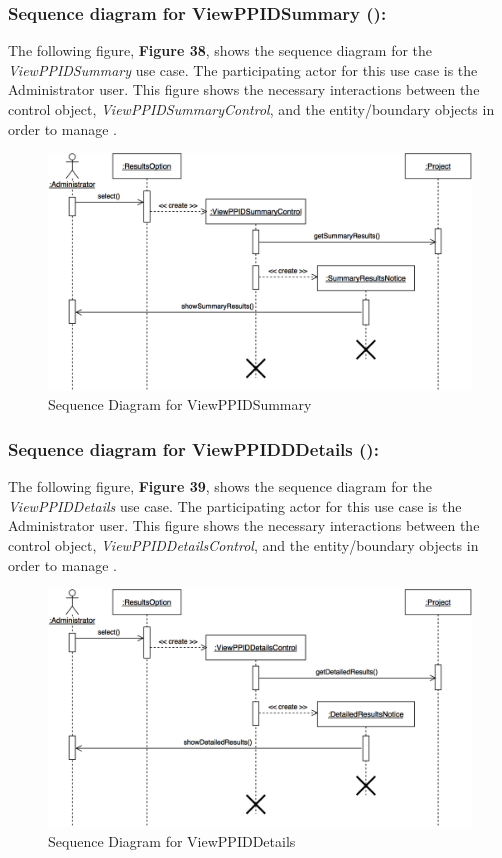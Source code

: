 \documentclass[12pt,letterpaper]{article}
\begin{document}
\subsubsection*{Sequence diagram for ViewPPIDSummary (\viewppidsummary{}):}

The following figure, {\bf Figure 38}, shows the sequence diagram for the {\it ViewPPIDSummary} use case. The participating actor for this use case is
the Administrator user. This figure shows the necessary interactions between the control object, {\it ViewPPIDSummaryControl}, and the
entity/boundary objects in order to manage \viewppidsummary{}.

\begin{figure}[H]
	\centering{}
	\includegraphics[scale=0.3]{imgs/seq/view-ppid-summary.png}
	\caption{Sequence Diagram for ViewPPIDSummary}
\end{figure}

\subsubsection*{Sequence diagram for ViewPPIDDDetails (\viewppiddetails{}):}

The following figure, {\bf Figure 39}, shows the sequence diagram for the {\it ViewPPIDDetails} use case. The participating actor for this use case is
the Administrator user. This figure shows the necessary interactions between the control object, {\it ViewPPIDDetailsControl}, and the
entity/boundary objects in order to manage \viewppiddetails{}.

\begin{figure}[H]
	\centering{}
	\includegraphics[scale=0.3]{imgs/seq/view-ppid-details.png}
	\caption{Sequence Diagram for ViewPPIDDetails}
\end{figure}
\end{document}
